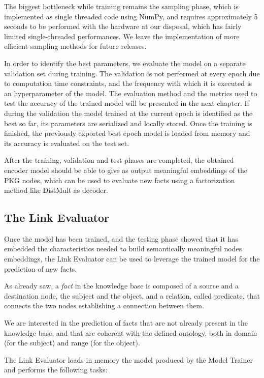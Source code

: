 \documentclass[%
    corpo=13.5pt,
    twoside,
    oldstyle,
    tipotesi=magistrale,
    greek,
    evenboxes
]{toptesi}
\begin{document}
The biggest bottleneck while training remains the sampling phase, which is
implemented as single threaded code using NumPy\cite{oliphant2006}, and
requires approximately 5 seconds to be performed with the hardware at our
disposal, which has fairly limited single-threaded performances. We
leave the implementation of more efficient sampling methods for future releases.

In order to identify the best parameters, we evaluate the model on a separate
validation set during training.
The validation is not performed at every epoch due to computation time
constraints, and the frequency with which it is executed is an hyperparameter
of the model.
The evaluation method and the metrics used to test the accuracy of the
trained model will be presented in the next chapter.
If during the validation the model trained at the current epoch is identified
as the best so far, its parameters are serialized and locally stored.
Once the training is finished, the previously exported best epoch model is
loaded from memory and its accuracy is evaluated on the test set.

After the training, validation and test phases are completed, the obtained
encoder model should be able to give as output meaningful embeddings of the
PKG nodes, which can be used to evaluate new facts using a factorization method
like DistMult as decoder.


\subsection{The Link Evaluator}

Once the model has been trained, and the testing phase showed
that it has embedded the characteristics needed to build
semantically meaningful nodes embeddings, the Link Evaluator can be
used to leverage the trained model for the prediction of new facts.

As already saw, a \emph{fact} in the knowledge base is composed of a source
and a destination node, the subject and the object, and a relation, called
predicate, that connects the two nodes establishing a connection between them.

We are interested in the prediction of facts that are not already present in
the knowledge base, and that are coherent with the defined ontology, both in
domain (for the subject) and range (for the object).

The Link Evaluator loads in memory the model produced by the Model Trainer and
performs the following tasks:
\end{document}
